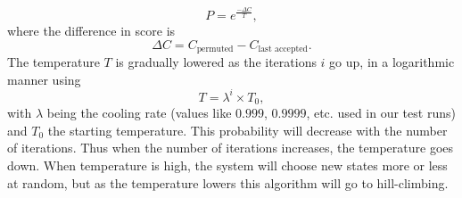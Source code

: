 \documentclass[journal]{IEEEtran}
\begin{document}
\begin{equation}\label{eq:transition_probability}
P = e^{\frac{−\Delta C}{T}} ,
\end{equation}where the difference in score is 
\begin{equation}
\Delta C = C_{\text{permuted}} - C_{\text{last accepted}}.
\end{equation}
The temperature $T$ is gradually lowered as the iterations $i$ go up, in a logarithmic manner using
\begin{equation}
T = \lambda^i \times T_0,
\end{equation}
with $\lambda$ being the cooling rate (values like $0.999$, $0.9999$, etc. used in our test runs) and $T_0$ the starting temperature. This probability will decrease with the number of iterations. Thus when the number of iterations increases, the temperature goes down. When temperature is high, the system will choose new states more or less at random, but as the temperature lowers this algorithm will go to hill-climbing. 
\end{document}
